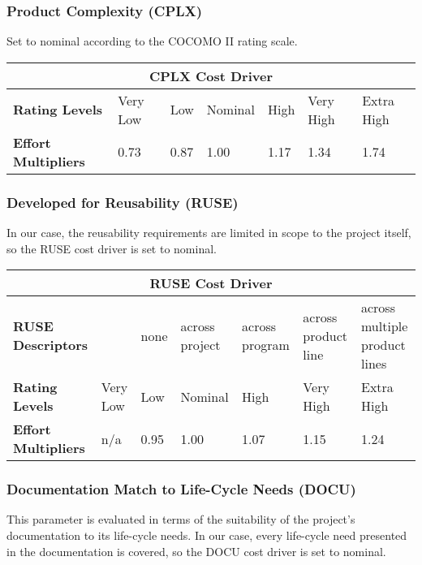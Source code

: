 \subsubsection*{Product Complexity (CPLX)}
Set to nominal according to the COCOMO II rating scale.

\begin{table}[H]
	\centering
	\begin{tabular}{| m{1.8cm} | m{1.7cm} | m{0.8cm} | m{1.5cm} | m{0.9cm} | m{1.8cm} | m{2cm} | }
		\hline
		\multicolumn{7}{|c|}{ \textbf{CPLX Cost Driver} } \\
		\hline
		\hline
		\textbf{Rating Levels} & Very Low & Low & Nominal & High & Very High & Extra High \\
		\hline
		\textbf{Effort Multipliers} & 0.73 & 0.87 & 1.00 & 1.17 & 1.34 & 1.74 \\ 
		\hline
	\end{tabular}
\end{table}
\newpage
\subsubsection*{Developed for Reusability (RUSE)}
In our case, the reusability requirements are limited in scope to the project itself, so the RUSE cost driver is set to nominal.

\begin{table}[H]
	\centering
	\begin{tabular}{| m{1.8cm} | m{0.8cm} | m{0.8cm} | m{1.5cm} | m{1.6cm} | m{1.5cm} | m{2.8cm} | }
		\hline
		\multicolumn{7}{|c|}{ \textbf{RUSE Cost Driver} } \\
		\hline
		\hline
		\textbf{RUSE Descriptors} & & none  & across project & across program & across product line & across multiple product lines \\
		\hline
		\textbf{Rating Levels} & Very Low & Low & Nominal & High & Very High & Extra High \\
		\hline
		\textbf{Effort Multipliers} & n/a & 0.95 & 1.00 & 1.07 & 1.15 & 1.24 \\ 
		\hline
	\end{tabular}
\end{table} 

\subsubsection*{Documentation Match to Life-Cycle Needs (DOCU)}
This parameter is evaluated in terms of the suitability of the project's documentation to its life-cycle needs. In our case, every life-cycle need presented in the documentation is covered, so the DOCU cost driver is set to nominal.

